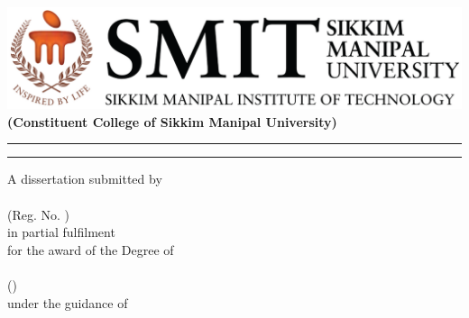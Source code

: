\begin{titlepage}
\centering
\large 
\vspace*{-2\baselineskip}
\includegraphics[scale=.6]{img/smit-logo}\\[-1.5em]

{\color{orange}\bf (Constituent College of Sikkim Manipal University)}\\[1em]

\rule{\linewidth}{2pt}
{\Huge\textbf{\thesistitle}}
\rule{\linewidth}{4pt}

A dissertation submitted by\\
	
	{\bf  \studentname}\\
\baselineskip=18pt 	(Reg. No. \regno)\\[\baselineskip]
	
	in partial fulfilment\\
	\baselineskip=18pt for the award of the Degree of \\
	
	{\bf \degree}\\
	
	(\coursename)\\[2\baselineskip]
	
	\baselineskip=18pt 	under the guidance of \\
	\baselineskip=18pt \textbf{\guidename}\\
	\baselineskip=18pt 	\guidedesignation
	
	\vfill

	\textsc{\department}\\
	
	\textsc{\institute}\\
	\textsc{\university} \\
	\submissiondate\\
	\vspace{1em}

\end{titlepage}